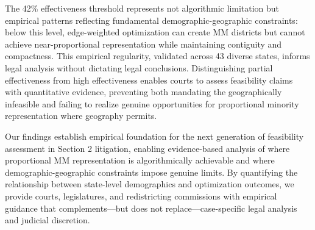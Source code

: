 The 42\% effectiveness threshold represents not algorithmic limitation but empirical patterns reflecting fundamental demographic-geographic constraints: below this level, edge-weighted optimization can create MM districts but cannot achieve near-proportional representation while maintaining contiguity and compactness. This empirical regularity, validated across 43 diverse states, informs legal analysis without dictating legal conclusions. Distinguishing partial effectiveness from high effectiveness enables courts to assess feasibility claims with quantitative evidence, preventing both mandating the geographically infeasible and failing to realize genuine opportunities for proportional minority representation where geography permits.

Our findings establish empirical foundation for the next generation of feasibility assessment in Section 2 litigation, enabling evidence-based analysis of where proportional MM representation is algorithmically achievable and where demographic-geographic constraints impose genuine limits. By quantifying the relationship between state-level demographics and optimization outcomes, we provide courts, legislatures, and redistricting commissions with empirical guidance that complements---but does not replace---case-specific legal analysis and judicial discretion.
